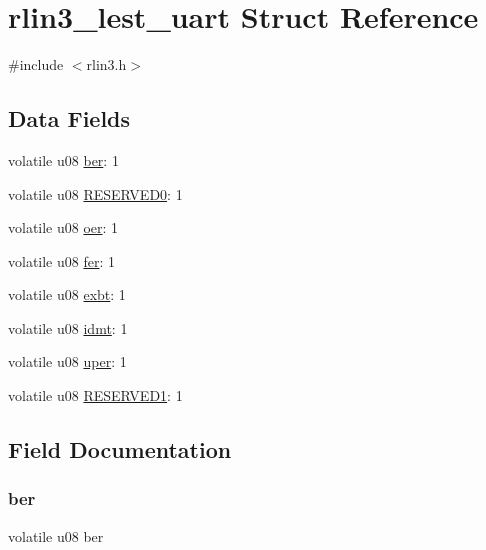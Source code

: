 \hypertarget{structrlin3__lest__uart}{}\section{rlin3\+\_\+lest\+\_\+uart Struct Reference}
\label{structrlin3__lest__uart}


{\ttfamily \#include $<$rlin3.\+h$>$}

\subsection*{Data Fields}
\begin{DoxyCompactItemize}
\item 
volatile u08 \mbox{\hyperlink{structrlin3__lest__uart_acb87d2f20052be8f94f093ea3dcc4edb}{ber}}\+: 1
\item 
volatile u08 \mbox{\hyperlink{structrlin3__lest__uart_a59c0b30ccfb89f1b34e9682741859abd}{R\+E\+S\+E\+R\+V\+E\+D0}}\+: 1
\item 
volatile u08 \mbox{\hyperlink{structrlin3__lest__uart_aa5752114137e163e4324f871e3be23e1}{oer}}\+: 1
\item 
volatile u08 \mbox{\hyperlink{structrlin3__lest__uart_ac24a35a9e7e45f5a033cf204cee0d1b0}{fer}}\+: 1
\item 
volatile u08 \mbox{\hyperlink{structrlin3__lest__uart_ae98c10afee60dc882be4f39f3bf2ca15}{exbt}}\+: 1
\item 
volatile u08 \mbox{\hyperlink{structrlin3__lest__uart_a67706df5dc7c4fc014a7bff4ec437861}{idmt}}\+: 1
\item 
volatile u08 \mbox{\hyperlink{structrlin3__lest__uart_a62dc79b71c0ff7a5228e0e7632b0ab80}{uper}}\+: 1
\item 
volatile u08 \mbox{\hyperlink{structrlin3__lest__uart_a715c3fdf1f14a6aa267daed3d2d6fba1}{R\+E\+S\+E\+R\+V\+E\+D1}}\+: 1
\end{DoxyCompactItemize}


\subsection{Field Documentation}
\mbox{\label{structrlin3__lest__uart_acb87d2f20052be8f94f093ea3dcc4edb}} 
\subsubsection{\texorpdfstring{ber}{ber}}
{\footnotesize\ttfamily volatile u08 ber}

